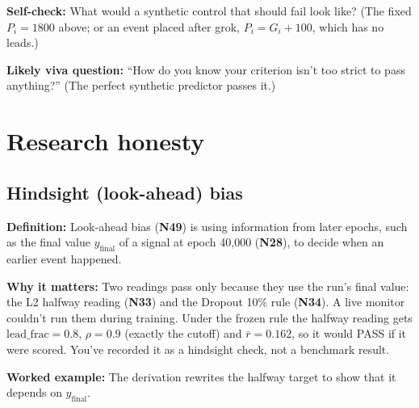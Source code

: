 \documentclass[11pt,a4paper,oneside,openany]{report}
\newcommand{\leadfrac}{\mathrm{lead\_frac}}
\newcommand{\rbar}{\bar{r}}
\newcommand{\yfinal}{y_{\mathrm{final}}}
\newcommand{\gl}[1]{\textbf{#1}}   %
\newcommand{\fdef}{\textbf{Definition:} }
\newcommand{\fwhy}{\par\textbf{Why it matters:} }
\newcommand{\fex}{\par\textbf{Worked example:} }
\newcommand{\fself}{\par\textbf{Self-check:} }
\newcommand{\fviva}{\par\textbf{Likely viva question:} }
\begin{document}
\fself What would a synthetic control that should fail look like? (The fixed $P_i = 1800$ above; or an event placed after grok, $P_i = G_i + 100$, which has no leads.)
\fviva ``How do you know your criterion isn't too strict to pass anything?'' (The perfect synthetic predictor passes it.)

\chapter{Research honesty}

\section{Hindsight (look-ahead) bias}
\fdef Look-ahead bias (\gl{N49}) is using information from later epochs, such as the final value $\yfinal$ of a signal at epoch 40{,}000 (\gl{N28}), to decide when an earlier event happened.
\fwhy Two readings pass only because they use the run's final value: the L2 halfway reading (\gl{N33}) and the Dropout 10\% rule (\gl{N34}). A live monitor couldn't run them during training. Under the frozen rule the halfway reading gets $\leadfrac = 0.8$, $\rho = 0.9$ (exactly the cutoff) and $\rbar = 0.162$, so it would PASS if it were scored. You've recorded it as a hindsight check, not a benchmark result.
\fex The derivation rewrites the halfway target to show that it depends on $\yfinal$.
\end{document}
